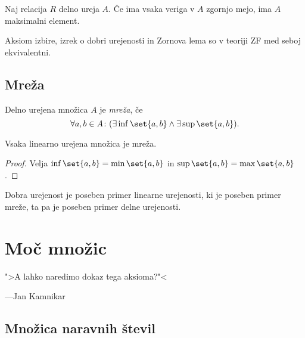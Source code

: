 \documentclass[12pt, a4paper]{article}
\begin{document}
\begin{lema}[Zorn]
Naj relacija $R$ delno ureja $A$. Če ima vsaka veriga v $A$ zgornjo mejo, ima $A$ maksimalni element.
\end{lema}

\begin{opomba}
Aksiom izbire, izrek o dobri urejenosti in Zornova lema so v teoriji ZF med seboj ekvivalentni.
\end{opomba}

\newpage

\subsection{Mreža}

\begin{okvir}
\begin{definicija}
Delno urejena množica $A$ je \emph{mreža}, če
\[
\forall a,b\in A\colon (\exists\inf\set{a,b}\land\exists\sup\set{a,b}).
\]
\end{definicija}
\end{okvir}

\begin{posledica}
Vsaka linearno urejena množica je mreža.
\end{posledica}

\begin{proof}
Velja $\inf\set{a,b}=\min\set{a,b}$ in $\sup\set{a,b}=\max\set{a,b}$.
\end{proof}

\begin{opomba}
Dobra urejenost je poseben primer linearne urejenosti, ki je poseben primer mreže, ta pa je poseben primer delne urejenosti.
\end{opomba}

\newpage

\section{Moč množic}

\epigraph{">A lahko naredimo dokaz tega aksioma?"<}{---Jan Kamnikar}

\subsection{Množica naravnih števil}
\end{document}
